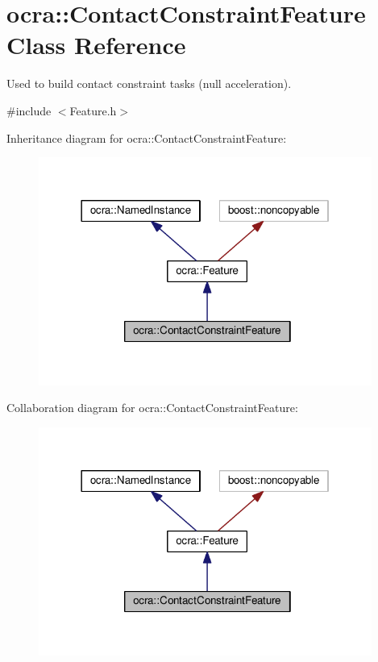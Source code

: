 \hypertarget{classocra_1_1ContactConstraintFeature}{}\section{ocra\+:\+:Contact\+Constraint\+Feature Class Reference}
\label{classocra_1_1ContactConstraintFeature}


Used to build contact constraint tasks (null acceleration).  




{\ttfamily \#include $<$Feature.\+h$>$}



Inheritance diagram for ocra\+:\+:Contact\+Constraint\+Feature\+:
\nopagebreak
\begin{figure}[H]
\begin{center}
\leavevmode
\includegraphics[width=310pt]{d5/d61/classocra_1_1ContactConstraintFeature__inherit__graph}
\end{center}
\end{figure}


Collaboration diagram for ocra\+:\+:Contact\+Constraint\+Feature\+:
\nopagebreak
\begin{figure}[H]
\begin{center}
\leavevmode
\includegraphics[width=310pt]{df/d49/classocra_1_1ContactConstraintFeature__coll__graph}
\end{center}
\end{figure}
